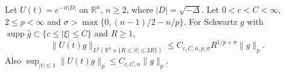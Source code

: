 Let $U(t)=e^{-it|D|}$ on $\mathbb R^n$, $n\ge2$, where $|D|=\sqrt{-\Delta}$. Let $0<c<C<\infty$, $2\le p<\infty$ and $\sigma>\max\{0,(n-1)/2-n/p\}$. For Schwartz $g$ with $\operatorname{supp}\widehat g\subset\{c\le|\xi|\le C\}$ and $R\ge1$,
\[
\|U(t)g\|_{L^p(\mathbb R^n\times\{R\le|t|\le 2R\})}
 \le C_{c,C,n,p,\sigma}R^{1/p+\sigma}\|g\|_p.
\]
Also $\sup_{|t|\le1}\|U(t)g\|_p\le C_{c,C,n}\|g\|_p$.

